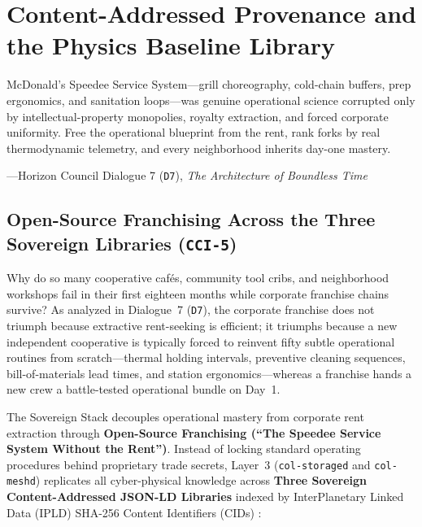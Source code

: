 \chapter{Content-Addressed Provenance and the Physics Baseline Library}
\label{ch:provenance-physics-baseline}

\epigraph{McDonald's Speedee Service System---grill choreography, cold-chain buffers, prep ergonomics, and sanitation loops---was genuine operational science corrupted only by intellectual-property monopolies, royalty extraction, and forced corporate uniformity. Free the operational blueprint from the rent, rank forks by real thermodynamic telemetry, and every neighborhood inherits day-one mastery.}{---Horizon Council Dialogue 7 (\texttt{D7}), \textit{The Architecture of Boundless Time}}

\section{Open-Source Franchising Across the Three Sovereign Libraries (\texttt{CCI-5})}
\label{sec:ch3-sovereign-libraries}

Why do so many cooperative caf\'es, community tool cribs, and neighborhood workshops fail in their first eighteen months while corporate franchise chains survive? As analyzed in Dialogue~7 (\texttt{D7}), the corporate franchise does not triumph because extractive rent-seeking is efficient; it triumphs because a new independent cooperative is typically forced to reinvent fifty subtle operational routines from scratch---thermal holding intervals, preventive cleaning sequences, bill-of-materials lead times, and station ergonomics---whereas a franchise hands a new crew a battle-tested operational bundle on Day~1.

The Sovereign Stack decouples operational mastery from corporate rent extraction through \textbf{Open-Source Franchising (``The Speedee Service System Without the Rent'')}. Instead of locking standard operating procedures behind proprietary trade secrets, Layer~3 (\texttt{col-storaged} and \texttt{col-meshd}) replicates all cyber-physical knowledge across \textbf{Three Sovereign Content-Addressed JSON-LD Libraries} indexed by InterPlanetary Linked Data (IPLD) SHA-256 Content Identifiers (CIDs) \parencite{w3c2020jsonld,kleppmann2017designing}:

